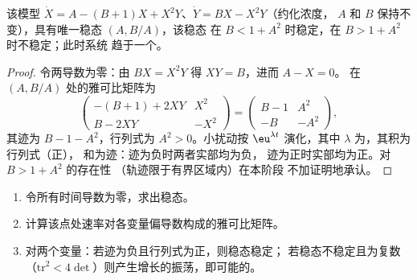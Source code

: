 \begin{proposition}[布鲁塞尔振子的失稳]\label{prop:b3:complex-kinetics:hopf}
该模型 $\dot X = A - (B + 1)X + X^2Y$、$\dot Y = BX - X^2Y$（约化浓度，
$A$ 和 $B$ 保持不变），具有唯一稳态 $(A, B/A)$，该稳态
在 $B < 1 + A^2$ 时稳定，在 $B > 1 + A^2$ 时不稳定；此时系统
趋于一个。
\end{proposition}

\begin{proof}
令两导数为零：由 $BX = X^2Y$ 得 $XY = B$，进而 $A - X = 0$。
在 $(A, B/A)$ 处的雅可比矩阵为
\[
  \begin{pmatrix} -(B + 1) + 2XY & X^2 \\ B - 2XY & -X^2 \end{pmatrix}
  = \begin{pmatrix} B - 1 & A^2 \\ -B & -A^2 \end{pmatrix},
\]
其迹为 $B - 1 - A^2$，行列式为 $A^2 > 0$。小扰动按
$\eu^{\lambda t}$ 演化，其中 $\lambda$ 为，其积为行列式（正），
和为迹：迹为负时两者实部均为负，
迹为正时实部均为正。对 $B > 1 + A^2$ 的存在性
（轨迹限于有界区域内）在本阶段
不加证明地承认。
\end{proof}

\begin{method}[稳态的线性稳定性]\label{met:b3:complex-kinetics:stability}
\begin{enumerate}
  \item 令所有时间导数为零，求出稳态。
  \item 计算该点处速率对各变量偏导数构成的雅可比矩阵。
  \item 对两个变量：若迹为负且行列式为正，则稳态稳定；
        若稳态不稳定且为复数
        （$\mathrm{tr}^2 < 4\det$）则产生增长的振荡，即可能的。
\end{enumerate}
\end{method}

